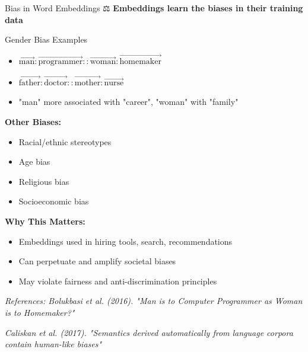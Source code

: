 \documentclass[aspectratio=169]{beamer}
\begin{document}
\begin{frame}[shrink=10]{Bias in Word Embeddings ⚖️}
\textbf{Embeddings learn the biases in their training data}

\vspace{1em}

\begin{exampleblock}{Gender Bias Examples}
\begin{itemize}\setlength{\itemsep}{0pt}
    \item $\vec{\text{man}} : \vec{\text{programmer}} :: \vec{\text{woman}} : \vec{\text{homemaker}}$
    \item $\vec{\text{father}} : \vec{\text{doctor}} :: \vec{\text{mother}} : \vec{\text{nurse}}$
    \item "man" more associated with "career", "woman" with "family"
\end{itemize}
\end{exampleblock}

\vspace{0.5em}

\textbf{Other Biases:}
\begin{itemize}\setlength{\itemsep}{0pt}
    \item Racial/ethnic stereotypes
    \item Age bias
    \item Religious bias
    \item Socioeconomic bias
\end{itemize}

\vspace{1em}

\textbf{Why This Matters:}
\begin{itemize}\setlength{\itemsep}{0pt}
    \item Embeddings used in hiring tools, search, recommendations
    \item Can perpetuate and amplify societal biases
    \item May violate fairness and anti-discrimination principles
\end{itemize}

\vspace{0.5em}
\small
\textit{References: Bolukbasi et al. (2016). "Man is to Computer Programmer as Woman is to Homemaker?"}

\textit{Caliskan et al. (2017). "Semantics derived automatically from language corpora contain human-like biases"}
\end{frame}
\end{document}
